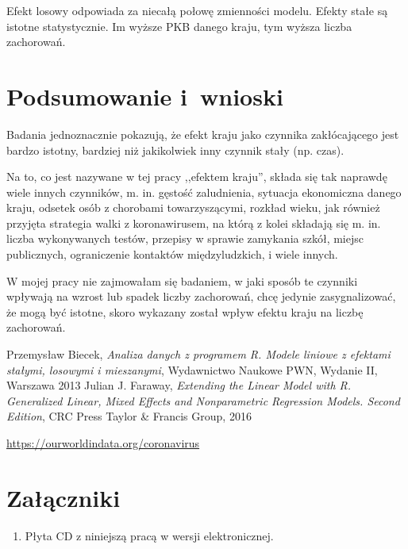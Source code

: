 \documentclass[12pt]{mwbk}
\theoremstyle{plain}
\theoremstyle{definition}
\theoremstyle{remark}
\begin{document}
Efekt losowy odpowiada za niecałą połowę zmienności modelu. Efekty stałe są istotne statystycznie. Im wyższe PKB danego kraju, tym wyższa liczba zachorowań.
\chapter*{Podsumowanie i~wnioski}

Badania jednoznacznie pokazują, że efekt kraju jako czynnika zakłócającego jest bardzo istotny, bardziej niż jakikolwiek inny czynnik stały (np. czas).

Na to, co jest nazywane w tej pracy ,,efektem kraju'', składa się tak naprawdę wiele innych czynników, m. in. gęstość zaludnienia, sytuacja ekonomiczna danego kraju, odsetek osób z chorobami towarzyszącymi, rozkład wieku, jak również przyjęta strategia walki z koronawirusem, na którą z kolei składają się m. in. liczba wykonywanych testów, przepisy w sprawie zamykania szkół, miejsc publicznych, ograniczenie kontaktów międzyludzkich, i wiele innych.

W mojej pracy nie zajmowałam się badaniem, w jaki sposób te czynniki wpływają na wzrost lub spadek liczby zachorowań, chcę jedynie zasygnalizować, że mogą być istotne, skoro wykazany został wpływ efektu kraju na liczbę zachorowań.

\begin{thebibliography}{99}

 Przemysław Biecek, \emph{Analiza danych z programem R. Modele liniowe z efektami stałymi, losowymi i mieszanymi}, Wydawnictwo Naukowe PWN, Wydanie II, Warszawa 2013
 Julian J. Faraway, \emph{Extending the Linear Model with R. Generalized Linear, Mixed Effects and Nonparametric Regression Models. Second Edition}, CRC Press Taylor \& Francis  Group, 2016

 \url{https://ourworldindata.org/coronavirus}

\end{thebibliography}



\listoffigures

\listoftables


\chapter*{Załączniki}
\begin{enumerate}
\item Płyta CD z niniejszą pracą w wersji elektronicznej.
\end{enumerate}
\end{document}
